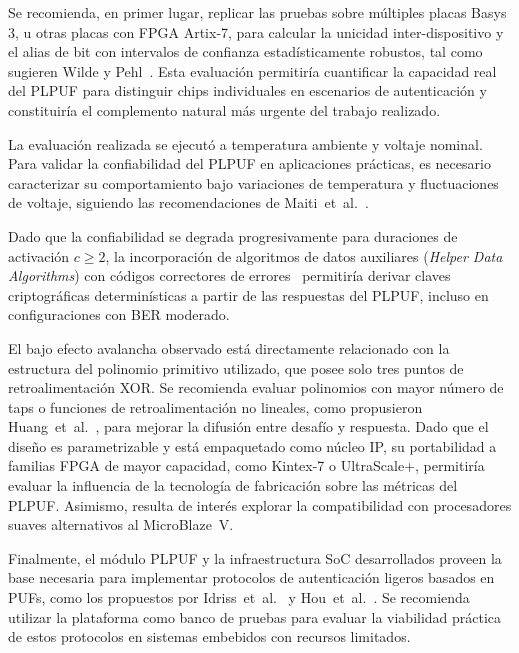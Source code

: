Se recomienda, en primer lugar, replicar las pruebas sobre múltiples placas
Basys\,3, u otras placas con FPGA Artix-7, para calcular la unicidad
inter-dispositivo y el alias de bit con intervalos de confianza
estadísticamente robustos, tal como sugieren Wilde y
Pehl~\cite{wilde_2020_confidence}. Esta evaluación permitiría cuantificar
la capacidad real del PLPUF para distinguir chips individuales en escenarios
de autenticación y constituiría el complemento natural más urgente del
trabajo realizado.

La evaluación realizada se ejecutó a temperatura ambiente y voltaje nominal.
Para validar la confiabilidad del PLPUF en aplicaciones prácticas, es
necesario caracterizar su comportamiento bajo variaciones de temperatura y
fluctuaciones de voltaje, siguiendo las recomendaciones de
Maiti~et~al.~\cite{maiti_2012_systematic}.

Dado que la confiabilidad se degrada progresivamente para duraciones de
activación $c \geq 2$, la incorporación de algoritmos de datos auxiliares
(\textit{Helper Data Algorithms}) con códigos correctores de
errores~\cite{delvaux_2015_helper} permitiría derivar claves criptográficas
determinísticas a partir de las respuestas del PLPUF, incluso en
configuraciones con BER moderado.

El bajo efecto avalancha observado está directamente relacionado con la
estructura del polinomio primitivo utilizado, que posee solo tres puntos de
retroalimentación XOR. Se recomienda evaluar polinomios con mayor número de
taps o funciones de retroalimentación no lineales, como propusieron
Huang~et~al.~\cite{huang_2024_nlfsr}, para mejorar la difusión entre desafío
y respuesta. Dado que el diseño es parametrizable y está empaquetado como núcleo IP, su
portabilidad a familias FPGA de mayor capacidad, como Kintex-7 o UltraScale+,
permitiría evaluar la influencia de la tecnología de fabricación sobre las
métricas del PLPUF. Asimismo, resulta de interés explorar la compatibilidad
con procesadores suaves alternativos al MicroBlaze~V.

Finalmente, el módulo PLPUF y la infraestructura SoC desarrollados proveen la
base necesaria para implementar protocolos de autenticación ligeros basados en
PUFs, como los propuestos por Idriss~et~al.~\cite{idriss_2021_lightweight} y
Hou~et~al.~\cite{hou_2023_modeling}. Se recomienda utilizar la plataforma
como banco de pruebas para evaluar la viabilidad práctica de estos protocolos
en sistemas embebidos con recursos limitados.

